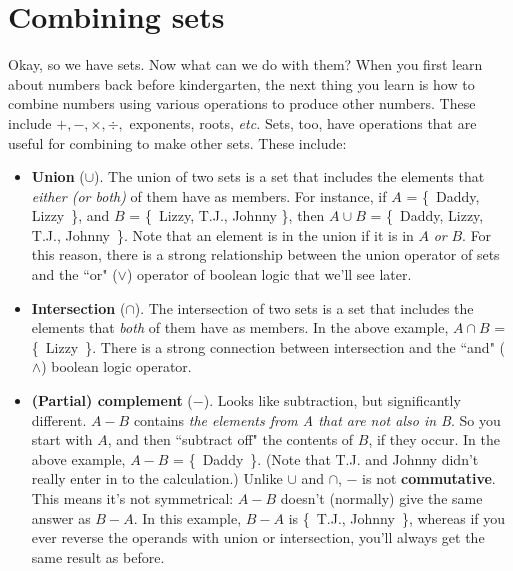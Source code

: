 \section{Combining sets}

Okay, so we have sets. Now what can we do with them? When you first learn
about numbers back before kindergarten, the next thing you learn is how to
combine numbers using various operations to produce other numbers. These
include $+, -, \times, \div,$ exponents, roots, \textit{etc.} Sets, too,
have operations that are useful for combining to make other sets. These
include:

\begin{itemize}

\item \textbf{Union} ($\cup$).  The union of two
sets is a set that includes the elements that \textit{either (or both)} of
them have as members.  For instance, if $A$ = \{~Daddy, Lizzy~\}, and $B$ =
\{~Lizzy, T.J., Johnny \}, then $A \cup B$ = \{~Daddy, Lizzy, T.J.,
Johnny~\}. Note that an element is in the union if it is in $A$ \textit{or}
$B$. For this reason, there is a strong relationship between the union
operator of sets and the ``or" ($\vee$) operator of boolean logic that
we'll see later.

\item \textbf{Intersection} ($\cap$).  The
intersection of two sets is a set that includes the elements that
\textit{both} of them have as members. In the above example, $A \cap B$ =
\{~Lizzy~\}. There is a strong connection between intersection and the
``and" ($\wedge$) boolean logic operator.

\item \textbf{(Partial) complement} ($-$).  Looks like subtraction, but significantly different. $A - B$
contains \textit{the elements from A that are not also in B}. So you start
with $A$, and then ``subtract off" the contents of $B$, if they occur. In
the above example, $A-B$ = \{~Daddy~\}.  (Note that T.J.  and Johnny didn't
really enter in to the calculation.) Unlike $\cup$ and $\cap$, $-$ is not
\textbf{commutative}.  This means it's not symmetrical:
$A-B$ doesn't (normally) give the same answer as $B-A$. In this example,
$B-A$ is \{~T.J., Johnny~\}, whereas if you ever reverse the operands with
union or intersection, you'll always get the same result as before.


\end{itemize}
